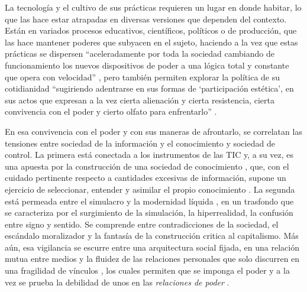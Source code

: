 \documentclass[spanish]{textolivre}
\begin{document}
La tecnología y el cultivo de sus prácticas requieren un lugar en donde habitar, lo que las hace estar atrapadas en diversas versiones que dependen del contexto. Están en variados procesos educativos, científicos, políticos o de producción, que las hace mantener poderes que subyacen en el sujeto, haciendo a la vez que estas prácticas se dispersen  “aceleradamente por toda la sociedad cambiando de funcionamiento los nuevos dispositivos de poder a una lógica total y constante que opera con velocidad” \cite[p. 18]{sibilia_hombre_2007}, pero también permiten explorar la política de su cotidianidad “sugiriendo adentrarse en sus formas de ‘participación estética’, en sus actos que expresan a la vez cierta alienación y cierta resistencia, cierta convivencia con el poder y cierto olfato para enfrentarlo” \cite[p. 7]{munoz_comunicacion_2007}.

En esa convivencia con el poder y con sus maneras de afrontarlo, se correlatan las tensiones entre sociedad de la información y el conocimiento y sociedad de control. La primera está conectada a los instrumentos de las TIC y, a su vez, es una apuesta por la construcción de una sociedad de conocimiento \cite{diaz_bernal_alisis_2012}, que, con el cuidado pertinente respecto a cantidades excesivas de información, supone un ejercicio de seleccionar, entender y asimilar el propio conocimiento \cite{barcelo_sociedad_1998}. La segunda está permeada entre el simulacro \cite{baudrillard_cultura_2013} y la modernidad líquida \cite{bauman_vigilancia_2013}, en un trasfondo que se caracteriza por el surgimiento de la simulación, la hiperrealidad, la confusión entre signo y sentido. Se comprende entre contradicciones de la sociedad, el escándalo moralizador y la fantasía de la construcción critica al capitalismo. Más aún, esa vigilancia se escurre entre una arquitectura social fijada, en una relación mutua entre medios y la fluidez de las relaciones personales que solo discurren en una fragilidad de vínculos \cite{bauman_vigilancia_2013}, los cuales permiten que se imponga el poder y a la vez se prueba la debilidad de unos en las \textit{relaciones de poder} \cite{foucault_redes_1982, garcia_universidad_2019}.
\end{document}
